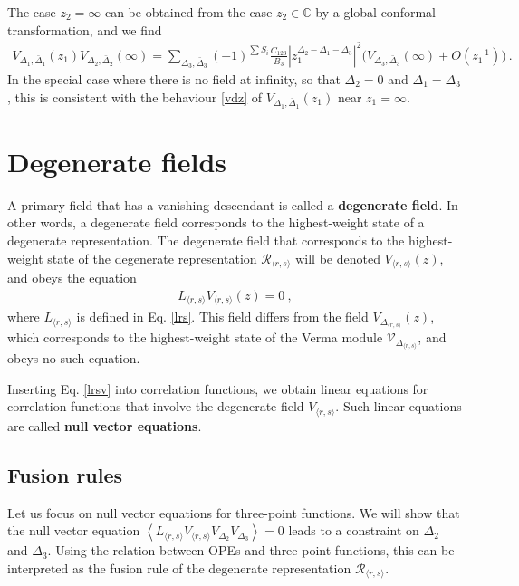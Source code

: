 \documentclass[12pt, a4paper, notitlepage, twoside]{report}
\numberwithin{equation}{section}
\theoremstyle{break}
\begin{document}
The case $z_2=\infty$ can be obtained from the case $z_2\in\mathbb{C}$ by a global conformal transformation, and we find 
\begin{align}
 V_{\Delta_1,\bar\Delta_1}(z_1) V_{\Delta_2,\bar\Delta_2}(\infty) =  \sum_{\Delta_3,\bar\Delta_3}(-1)^{\sum S_i}\frac{C_{123}}{B_3}\left| z_1^{\Delta_2-\Delta_1-\Delta_3}\right|^2 \Big( V_{\Delta_3,\bar\Delta_3}(\infty) + O\left(z_1^{-1}\right)\Big) \ .
 \label{iope}
\end{align}
In the special case where there is no field at infinity, so that $\Delta_2=0$ and $\Delta_1=\Delta_3$, this is consistent with the behaviour \eqref{vdz} of $V_{\Delta_1,\bar\Delta_1}(z_1)$ near $z_1=\infty$.


\section{Degenerate fields}\label{sec:degf}

A primary field that has a vanishing descendant is called a \textbf{\boldmath degenerate field}.
In other words, a degenerate field corresponds to the highest-weight state of a degenerate representation.
The degenerate field that corresponds to the highest-weight state of the degenerate representation $\mathcal{R}_{\langle r,s \rangle}$ will be denoted $V_{\langle r,s\rangle}(z)$, and obeys the equation 
\begin{align}
 L_{\langle r,s \rangle} V_{\langle r,s \rangle}(z) = 0 \ , 
\label{lrsv}
\end{align}
where $L_{\langle r,s \rangle}$ is defined in Eq. \eqref{lrs}.
This field differs from the field $V_{\Delta_{\langle r,s \rangle}}(z)$, which corresponds to the highest-weight state of the Verma module $\mathcal{V}_{\Delta_{\langle r,s \rangle}}$, and obeys no such equation.

Inserting Eq. \eqref{lrsv} into correlation functions, we obtain linear equations for correlation functions that involve the degenerate field $V_{\langle r,s\rangle}$. Such linear equations are called \textbf{\boldmath null vector equations}. 

\subsection{Fusion rules}\label{secfr}

Let us focus on null vector equations for three-point functions. 
We will show that the null vector equation $\left< L_{\langle r,s \rangle} V_{\langle r,s \rangle} V_{\Delta_2}V_{\Delta_3}\right>=0$ leads to
a constraint on $\Delta_2$ and $\Delta_3$. Using the relation between OPEs and three-point functions, this can be interpreted as the fusion rule of the degenerate representation $\mathcal{R}_{\langle r,s \rangle}$.
\end{document}
